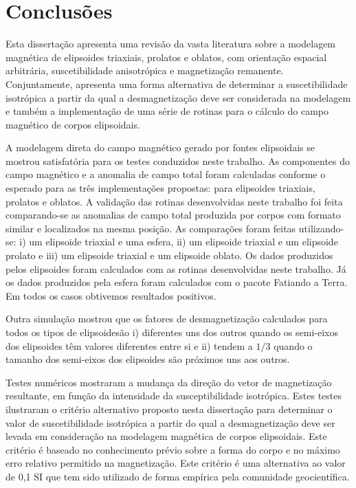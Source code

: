\chapter{Conclusões}

Esta dissertação apresenta uma revisão da vasta literatura sobre a modelagem magnética de elipsoides triaxiais, prolatos e oblatos, com orientação espacial arbitrária, suscetibilidade anisotrópica e magnetização remanente. Conjuntamente, apresenta uma forma alternativa de determinar a suscetibilidade isotrópica a partir da qual a desmagnetização deve ser considerada na modelagem e também a implementação de uma série de rotinas para o cálculo do campo magnético de corpos elipsoidais.

A modelagem direta do campo magnético gerado por fontes elipsoidais se mostrou satisfatória para os testes conduzidos neste trabalho. As componentes do campo magnético e a anomalia de campo total foram calculadas conforme o esperado para as três implementações propostas: para elipsoides triaxiais, prolatos e oblatos.
A validação das rotinas desenvolvidas neste trabalho foi feita comparando-se as anomalias de campo total produzida por corpos com formato similar e localizados na mesma posição. As comparações foram feitas utilizando-se: i) um elipsoide triaxial e uma esfera, ii) um elipsoide triaxial e um elipsoide prolato e iii) um elipsoide triaxial e um elipsoide oblato. Os dados produzidos pelos elipsoides foram calculados com as rotinas desenvolvidas neste trabalho. Já os dados produzidos pela esfera foram calculados com o pacote Fatiando a Terra. Em todos os casos obtivemos resultados positivos.

Outra simulação mostrou que os fatores de desmagnetização calculados para todos os tipos de elipsoidesão i) diferentes  uns dos outros quando os semi-eixos dos elipsoides têm valores diferentes entre si e ii) tendem a $1/3$ quando o tamanho dos semi-eixos dos elipsoides são próximos uns aos outros.

Testes numéricos mostraram a mudança da direção do vetor de magnetização resultante, em função da intensidade da susceptibilidade isotrópica. Estes testes ilustraram o critério alternativo proposto nesta dissertação para determinar o valor de suscetibilidade isotrópica a partir do qual a desmagnetização deve ser levada em consideração na modelagem magnética de corpos elipsoidais. Este critério é baseado no conhecimento prévio sobre a forma do corpo e no máximo erro relativo permitido na magnetização. Este critério é uma alternativa ao valor de 0,1 SI que tem sido utilizado de forma empírica pela comunidade geocientífica.

